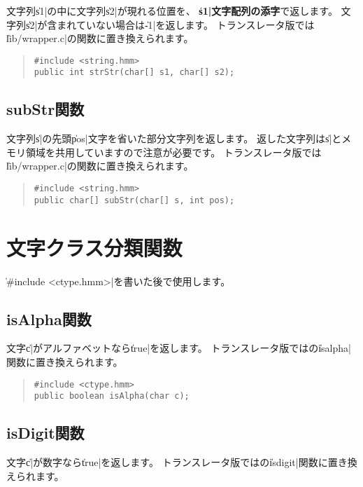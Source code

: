 文字列\|s1|の中に文字列\|s2|が現れる位置を、
{\bf\|s1|文字配列の添字}で返します。
文字列\|s2|が含まれていない場合は\|-1|を返します。
トランスレータ版では\|lib/wrapper.c|の関数に置き換えられます。

\begin{quote}
\begin{verbatim}
#include <string.hmm>
public int strStr(char[] s1, char[] s2);
\end{verbatim}
\end{quote}

\subsection{subStr関数}

文字列\|s|の先頭\|pos|文字を省いた部分文字列を返します。
返した文字列は\|s|とメモリ領域を共用していますので注意が必要です。
トランスレータ版では\|lib/wrapper.c|の関数に置き換えられます。

\begin{quote}
\begin{verbatim}
#include <string.hmm>
public char[] subStr(char[] s, int pos);
\end{verbatim}
\end{quote}

\section{文字クラス分類関数}

\|#include <ctype.hmm>|を書いた後で使用します。

\subsection{isAlpha関数}

文字\|c|がアルファベットなら\|true|を返します。
トランスレータ版では\cl の\|isalpha|関数に置き換えられます。

\begin{quote}
\begin{verbatim}
#include <ctype.hmm>
public boolean isAlpha(char c);
\end{verbatim}
\end{quote}

\subsection{isDigit関数}

文字\|c|が数字なら\|true|を返します。
トランスレータ版では\cl の\|isdigit|関数に置き換えられます。

